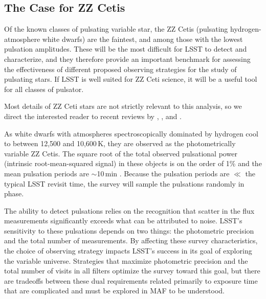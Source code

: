 \subsection{The Case for ZZ Cetis}
\label{sec:\secname:targets}

Of the known classes of pulsating variable star, the ZZ Cetis
(pulsating hydrogen-atmosphere white dwarfs) are the faintest, and among
those with the lowest pulsation amplitudes.  These will be the most
difficult for LSST to detect and characterize, and they therefore
provide an important benchmark for assessing the effectiveness of
different proposed observing strategies for the study of pulsating
stars.  If LSST is well suited for ZZ Ceti science, it will be a useful
tool for all classes of pulsator.

Most details of ZZ Ceti stars are not strictly relevant to this
analysis, so we direct the interested reader to recent reviews by
\citet{2008ARA&A..46..157W}, \citet{2008PASP..120.1043F}, and
\citet{2010A&ARv..18..471A}.

As white dwarfs with atmospheres spectroscopically dominated by hydrogen
cool to between 12,500 and 10,600\,K, they are observed as the
photometrically variable ZZ Cetis.  The square root of the total
observed pulsational power (intrinsic root-mean-squared signal) in these
objects is on the order of 1\% and the mean pulsation periods are
$\sim$10\,min \citep{2006ApJ...640..956M}.  Because the pulsation
periods are $\ll$ the typical LSST revisit time, the survey will sample
the pulsations randomly in phase.

The ability to detect pulsations relies on the recognition that scatter
in the flux measurements significantly exceeds what can be attributed to
noise.  LSST's sensitivity to these pulsations depends on two things:
the photometric precision and the total number of measurements.  By
affecting these survey characteristics, the choice of observing strategy
impacts LSST's success in its goal of exploring the variable universe.
Strategies that maximize photometric precision and the total number of
visits in all filters optimize the survey toward this goal, but there are
tradeoffs between these dual requirements related primarily to exposure
time that are complicated and must be explored in MAF to be understood.

